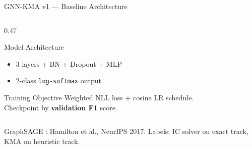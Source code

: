 \documentclass[aspectratio=169,10pt]{beamer}
\begin{document}
\begin{frame}{GNN-KMA v1 — Baseline Architecture}
\begin{columns}[T]
\begin{column}{0.47\textwidth}
\begin{block}{Model Architecture}
\begin{itemize}
            (separate in / out / self terms)
          \item 3 layers + BN + Dropout + MLP
          \item 2-class \texttt{log-softmax} output
        \end{itemize}
      \end{block}
      \vspace{2pt}
      \begin{block}{Training Objective}
        Weighted NLL loss $+$ cosine LR schedule.\\
        Checkpoint by \textbf{validation F1} score.
      \end{block}
    \end{column}
  \end{columns}
  \vspace{2pt}
  {\scriptsize\color{gray}
   GraphSAGE \cite{hamilton2017}: Hamilton et al., NeurIPS 2017.
   Labels: IC solver on exact track, KMA on heuristic track.}
\end{frame}
\end{document}
